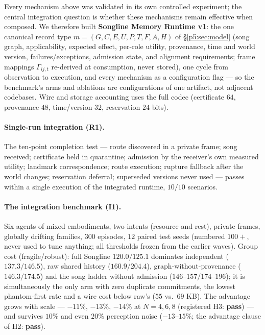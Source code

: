 \documentclass{article}
\begin{document}
Every mechanism above was validated in its own controlled experiment;
the central integration question is whether these mechanisms remain effective when composed. We therefore
built \textbf{Songline Memory Runtime v1}: the one canonical record
type $m = (G, C, E, U, P, T, F, A, H)$ of \S\ref{p5:sec:model} (song
graph, applicability, expected effect, per-role utility, provenance,
time and world version, failures/exceptions, admission state, and
alignment requirements; frame mappings $\Gamma_{ij,t}$ re-derived at
consumption, never stored), one cycle from observation to
execution, and every mechanism as a configuration flag --- so the
benchmark's arms and ablations are configurations of one artifact,
not adjacent codebases. Wire and storage accounting uses the full
codec (certificate $64$, provenance $48$, time/version $32$,
reservation $24$ bits).

\paragraph{Single-run integration (R1).} The ten-point completion
test --- route discovered in a private frame; song received;
certificate held in quarantine; admission by the receiver's own
measured utility; landmark correspondence; route execution; rupture
fallback after the world changes; reservation deferral; superseded
versions never used --- passes within a single execution of the
integrated runtime, $10/10$
scenarios.

\paragraph{The integration benchmark (I1).} Six agents of mixed
embodiments, two intents (resource and rest), private frames,
globally drifting families, $300$ episodes, $12$ paired test seeds
(numbered $100{+}$, never used to tune anything; all thresholds
frozen from the earlier waves). Group cost (fragile/robust): full
Songline $\mathbf{120.0/125.1}$ dominates independent ($137.3/146.5$),
raw shared history ($160.9/204.4$), graph-without-provenance
($146.3/174.5$) and the song ladder without admission
($146$--$157/174$--$196$); it is simultaneously the only arm with
zero duplicate commitments, the lowest phantom-first rate and a wire
cost below raw's ($55$ vs.\ $69$ KB). The advantage grows with scale
--- $-11\%$, $-13\%$, $-14\%$ at $N = 4, 6, 8$ (registered H3:
\textbf{pass}) --- and survives $10\%$ and even $20\%$ perception
noise ($-13$--$15\%$; the advantage clause of H2: \textbf{pass}).
\end{document}
